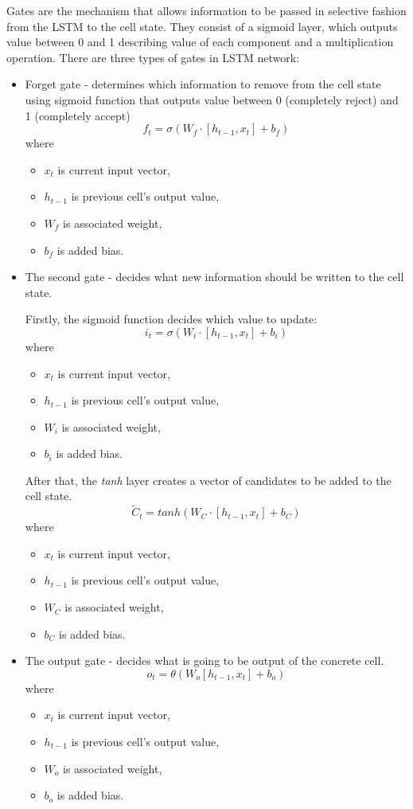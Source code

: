 \documentclass[11pt, a4paper]{article} %
\begin{document}
Gates are the mechanism that allows information to be passed in selective fashion from the LSTM to the cell state. They consist of a sigmoid layer, which outputs value between 0 and 1 describing value of each component and a multiplication operation.
There are three types of gates in LSTM network:
\begin{itemize}
	\item {Forget gate} - determines which information to remove from the cell state using sigmoid function that outputs value between 0 (completely reject) and 1 (completely accept)
		$$ f_{t} = \sigma (W_{f} \cdot [h_{t-1}, x_{t}] + b_{f}) $$
		where
		\begin{itemize}
			\item[] $ x_{t} $ is current input vector,
			\item[] $ h_{t-1} $ is previous cell's output value,
			\item[] $ W_{f} $ is associated weight,
			\item[] $ b_{f} $ is added bias.
		\end{itemize}
	\item {The second gate} - decides what new information should be written to the cell state. 
	
	Firstly, the sigmoid function decides which value to update:
	$$ i_{t} = \sigma (W_{i} \cdot [h_{t-1}, x_{t}] + b_{i}) $$ 
	where
	\begin{itemize}
		\item[] $ x_{t} $ is current input vector,
		\item[] $ h_{t-1} $ is previous cell's output value,
		\item[] $ W_{i} $ is associated weight,
		\item[] $ b_{i} $ is added bias.
	\end{itemize}

	After that, the \emph{tanh} layer creates a vector of candidates to be added to the cell state. 
	$$ \tilde{C}_{t} = tanh (W_{C} \cdot [h_{t-1}, x_{t}] + b_{C}) $$
	where
	\begin{itemize}
		\item[] $ x_{t} $ is current input vector,
		\item[] $ h_{t-1} $ is previous cell's output value,
		\item[] $ W_{C} $ is associated weight,
		\item[] $ b_{C} $ is added bias.
	\end{itemize}
	\item {The output gate} - decides what is going to be output of the concrete cell. 
	$$ o_{t} = \theta (W_{o} [h_{t-1}, x_{t}] + b_{o}) $$ 
	where
	\begin{itemize}
		\item[] $ x_{t} $ is current input vector,
		\item[] $ h_{t-1} $ is previous cell's output value,
		\item[] $ W_{o} $ is associated weight,
		\item[] $ b_{o} $ is added bias.
	\end{itemize}
	

\end{itemize}
\end{document}
